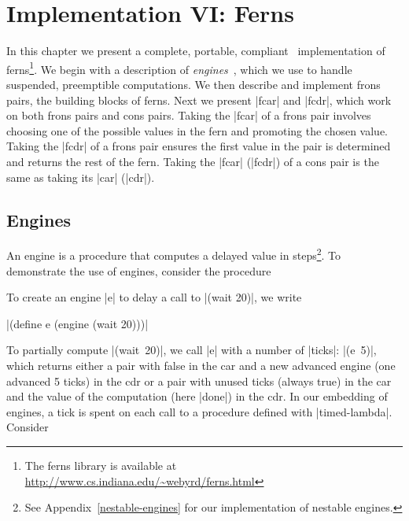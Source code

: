 \chapter{Implementation VI: Ferns}\label{fernsimpl}

In this chapter we present a complete, portable, \RsixRSsp
compliant~\cite{r6rs} implementation of ferns\footnote{The ferns
  library is available at
  \url{http://www.cs.indiana.edu/~webyrd/ferns.html}}. We begin with a
description of \emph{engines}~\cite{CHayne87}, which we use to handle
suspended, preemptible computations. We then describe and implement
frons pairs, the building blocks of ferns. Next we present
\scheme|fcar| and \scheme|fcdr|, which work on both frons pairs and
cons pairs. Taking the \scheme|fcar| of a frons pair involves choosing
one of the possible values in the fern and promoting the chosen value.
Taking the \scheme|fcdr| of a frons pair ensures the first value in
the pair is determined and returns the rest of the fern.  Taking the
\scheme|fcar| (\scheme|fcdr|) of a cons pair is the same as taking its
\scheme|car| (\scheme|cdr|).

\section{Engines}\label{fernsenginessection}

An engine is a procedure that computes a delayed value in steps\footnote{See Appendix~\ref{nestable-engines} for our implementation of nestable engines.}.
To demonstrate the use of engines, consider the procedure

\schemedisplayspace
{}

\noindent To create an engine \scheme|e| to delay a call to
\scheme|(wait 20)|, we write

\wspace
\scheme|(define e (engine (wait 20)))|
\wspace

\noindent 
To partially compute \mbox{\scheme|(wait 20)|}, we call \scheme|e|
with a number of \scheme|ticks|: \mbox{\scheme|(e 5)|}, which returns
either a pair with false in the car and a new advanced engine (one
advanced 5 ticks) in the cdr or a pair with unused ticks (always true)
in the car and the value of the computation (here \schemeresult|done|)
in the cdr.  In our embedding of engines, a tick is spent on each
call to a procedure defined with \scheme|timed-lambda|. Consider

\schemedisplayspace

\belowcodeskip 0pt

